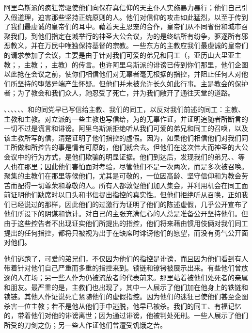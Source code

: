 阿里乌斯派的疯狂常驱使他们向保存真信仰的天主仆人实施暴力暴行；他们自己引入假道理，迫害那些坚持正统原则的人。他们对信仰的攻击如此猛烈，以至于传到了我们最虔诚的皇帝们的耳中。藉着天主恩宠的合作，皇帝们从不同省份和城市召聚我们，到他们指定在城举行的神圣大公会议，为的是终结所有纷争，驱逐所有邪恶教义，并在万民中唯独保持基督的宗教。一些东方的主教应我们最虔诚的皇帝们的请求参加了会议，主要是由于针对我们可爱的弟兄和同工（，亚历山大里亚主教；，主教；，主教）的传言。也许阿里乌斯派的诽谤已传到你们那里，他们企图以此抢在会议之前，使你们相信他们对无辜者毫无根据的指控，并阻止任何人对他们所坚持的堕落异端产生怀疑。但他们并未被允许长久如此行事。主是教会的保护者；为了教会和我们众人，祂忍受了死亡，并为我们敞开了通往天堂的道路。\par

、、、、、、和的同党早已写信给主教、我们的同工，以反对我们前述的同工：主教、主教和主教。对立派的一些主教也写信给，为的无辜作证，并证明追随者所断言的一切不过是谎言和诽谤。阿里乌斯派拒绝听从我们可爱的弟兄和同工的召唤，以及该主教所写的信，清楚证明了他们指控的虚假。因为，如果他们相信他们对我们同工所做和所控告的事是情有可原的，他们就会去。但他们在这次伟大而神圣的大公会议中的行为方式，是他们欺骗的明显证据。他们到达后，发现我们的弟兄、、等人也在那里；因此他们害怕面对考验，尽管他们不是一次两次，而是多次被召唤。聚集的主教们在那里等候他们，尤其是可敬的，一位因高龄、坚守信仰和为教会劳苦而配得一切尊荣和尊敬的人。所有人都敦促他们加入集会，并利用机会在同工面前证明他们缺席时以口头和书信提出指控的真实性。但他们拒绝听从召唤，正如我们已经说过的那样，因此他们的过激行为证明了他们的陈述虚假，几乎公开宣布了他们所设下的阴谋和诡计。对自己的主张充满信心的人总是准备公开坚持他们。但由于这些控告者不出现证实他们所提出的指控，他们将来藉由惯用伎俩对我们同工提出的任何指控，都将只被视为出于在缺席时诽谤他们的愿望，而没有勇气公开面对他们。\par

他们逃跑了，可爱的弟兄们，不仅因为他们的指控是诽谤，而且因为他们看到有人带着针对他们自己严重而多重的指控来到。锁链和镣铐被展示出来。有些他们曾放逐的人在场；另一些人作为仍被流放者的代表前来。那里站着被他们处死者的亲属和朋友。最严重的是，主教们也出现了，其中一人展示了他们加在他身上的铁链和锁链。其他人作证说死亡紧随他们的虚假指控。因为他们的迷狂已使他们甚至企图杀害一位主教；若不是他从他们手中逃脱，他早已被杀。我们的同工、有福记忆的，带着他们对他的诽谤离世；因为通过诽谤，他被判处死刑。一些人展示了他们所受的刀剑之伤；另一些人作证他们曾遭受饥饿之苦。\par

